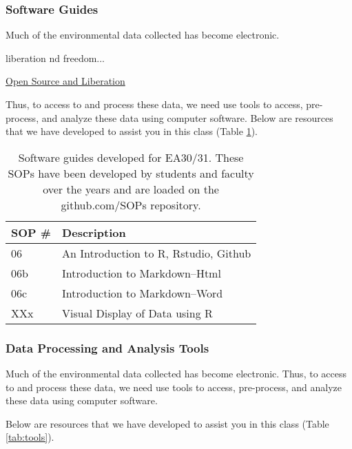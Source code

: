 \documentclass{article}\usepackage[]{graphicx}\usepackage[]{color}
\begin{document}
\subsubsection{Software Guides}

Much of the environmental data collected has become electronic. 

liberation nd freedom...

\href{https://github.com/marclos/Climate_Change_Narratives/raw/master/Admin/Liberation_via_Open_Source_Software.pdf}{Open Source and Liberation}


Thus, to access to and process these data, we need use tools to access, pre-process, and analyze these data using computer software. Below are resources that we have developed to assist you in this class (Table \ref{tab:softwareguides}).

\begin{table}[h]
\caption{Software guides developed for EA30/31. These SOPs have been developed by students and faculty over the years and are loaded on the github.com/SOPs repository.}\label{tab:softwareguides}
\centering
\begin{tabular}{ll}\hline
SOP \#    & Description                                 \\\hline\hline
06        & An Introduction to R, Rstudio, Github \\
06b       & Introduction to Markdown--Html  \\
06c       & Introduction to Markdown--Word  \\
XXx       & Visual Display of Data using R  \\
\hline
\end{tabular}
\end{table}

\subsubsection{Data Processing and Analysis Tools}

Much of the environmental data collected has become electronic. Thus, to access to and process these data, we need use tools to access, pre-process, and analyze these data using computer software. 

Below are resources that we have developed to assist you in this class (Table \ref{tab:tools}).
\end{document}
